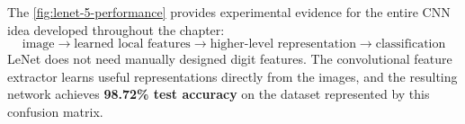 \noindent
The \autoref{fig:lenet-5-performance} provides experimental evidence for the entire CNN idea developed throughout the chapter:
\begin{equation*}
    \text{image}
    \rightarrow
    \text{learned local features}
    \rightarrow
    \text{higher-level representation}
    \rightarrow
    \text{classification}
\end{equation*}
LeNet does not need manually designed digit features. The convolutional feature extractor learns useful representations directly from the images, and the resulting network achieves \textbf{98.72\% test accuracy} on the dataset represented by this confusion matrix.